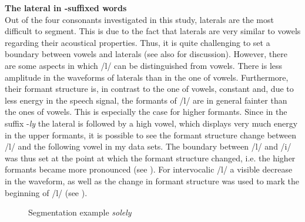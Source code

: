 \textbf {The lateral in -suffixed words} \label{ly-segmentation}\\




Out of the four consonants investigated in this study, laterals are the most difficult to segment. This is due to the fact that laterals are very similar to vowels regarding their acoustical properties. Thus, it is quite challenging to set a boundary between vowels and laterals (see also \citet[chapter 7]{Machac.2009} for discussion). However, there are some aspects in which /l/ can be distinguished from vowels. There is less amplitude in the waveforms of laterals than in the one of vowels.  Furthermore, their formant structure is, in contrast to the one of vowels, constant and, due to less energy in the speech signal, the formants of /l/ are in general fainter than the ones of vowels. This is especially the case for higher formants. Since in the suffix -\textit{ly} the lateral is followed by a high vowel, which displays very much energy in the upper formants, it is possible to see the formant structure change between /l/ and the following vowel in my data sets. The boundary between /l/ and /i/ was thus set at the point at which the formant structure changed, i.e. the higher formants became more pronounced (see ). For intervocalic /l/ a visible decrease in the waveform, as well as the change in formant structure was used to mark the beginning of /l/ (see ).
 
\begin{figure} [h!]
	\centering
	\caption{Segmentation example \textit{solely}}
	\label{fig:segmentation solely}
\end{figure}


